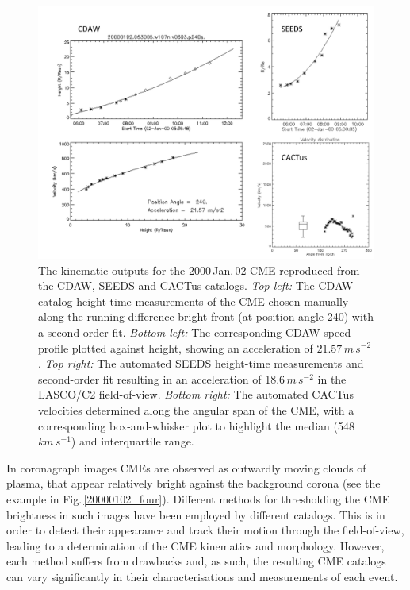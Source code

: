 \documentclass[referee,a4paper,12pt,traditabstract]{swsc}
\begin{document}
\begin{figure}[!h]
\centerline{\includegraphics[scale=0.68, trim=20 0 0 0, clip=true]{20000102_kins_plots.pdf}}
\caption{The kinematic outputs for the 2000\,Jan.\,02 CME reproduced from the CDAW, SEEDS and CACTus catalogs. \emph{Top left:} The CDAW catalog height-time measurements of the CME chosen manually along the running-difference bright front (at position angle 240) with a second-order fit. \emph{Bottom left:} The corresponding CDAW speed profile plotted against height, showing an acceleration of $21.57\,m\,s^{-2}$. \emph{Top right:} The automated SEEDS height-time measurements and second-order fit resulting in an acceleration of 18.6\,$m\,s^{-2}$ in the LASCO/C2 field-of-view. \emph{Bottom right:} The automated CACTus velocities determined along the angular span of the CME, with a corresponding box-and-whisker plot to highlight the median (548\,$km\,s^{-1}$) and interquartile range.}
\label{20000102_kins_plots}
\end{figure}

In coronagraph images CMEs are observed as outwardly moving clouds of plasma, that appear relatively bright against the background corona (see the example in Fig.\,\ref{20000102_four}). Different methods for thresholding the CME brightness in such images have been employed by different catalogs. This is in order to detect their appearance and track their motion through the field-of-view, leading to a determination of the CME kinematics and morphology. However, each method suffers from drawbacks and, as such, the resulting CME catalogs can vary significantly in their characterisations and measurements of each event. 
\end{document}
